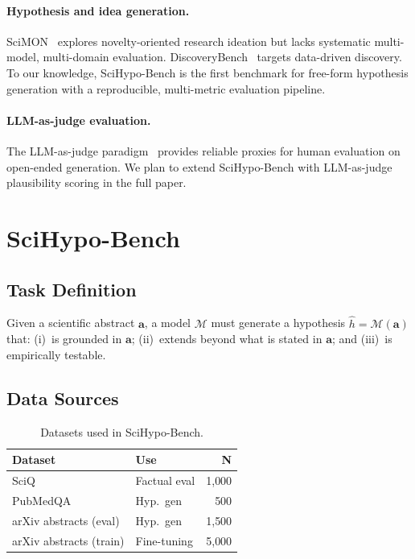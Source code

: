 \documentclass{article}
\begin{document}
\paragraph{Hypothesis and idea generation.}
SciMON~\cite{wang2023scimon} explores novelty-oriented research ideation but
lacks systematic multi-model, multi-domain evaluation.
DiscoveryBench~\cite{majumder2024discoverybench} targets data-driven discovery.
To our knowledge, SciHypo-Bench is the first benchmark for free-form hypothesis
generation with a reproducible, multi-metric evaluation pipeline.

\paragraph{LLM-as-judge evaluation.}
The LLM-as-judge paradigm~\cite{zheng2024judging} provides reliable proxies
for human evaluation on open-ended generation.
We plan to extend SciHypo-Bench with LLM-as-judge plausibility scoring in
the full paper.

\section{SciHypo-Bench}
\label{sec:benchmark}

\subsection{Task Definition}

Given a scientific abstract $\mathbf{a}$, a model $\mathcal{M}$ must generate
a hypothesis $\hat{h} = \mathcal{M}(\mathbf{a})$ that:
(i)~is grounded in $\mathbf{a}$;
(ii)~extends beyond what is stated in $\mathbf{a}$; and
(iii)~is empirically testable.

\subsection{Data Sources}

\begin{table}[h]
\centering\small
\caption{Datasets used in SciHypo-Bench.}
\label{tab:datasets}
\setlength{\tabcolsep}{4pt}
\begin{tabular}{llr}
\toprule
\textbf{Dataset} & \textbf{Use} & \textbf{N} \\
\midrule
SciQ~\cite{welbl2017crowdsourcing}  & Factual eval   & 1{,}000 \\
PubMedQA~\cite{jin2019pubmedqa}     & Hyp.\ gen      & 500     \\
arXiv abstracts (eval)              & Hyp.\ gen      & 1{,}500 \\
arXiv abstracts (train)             & Fine-tuning    & 5{,}000 \\
\bottomrule
\end{tabular}
\end{table}
\end{document}
